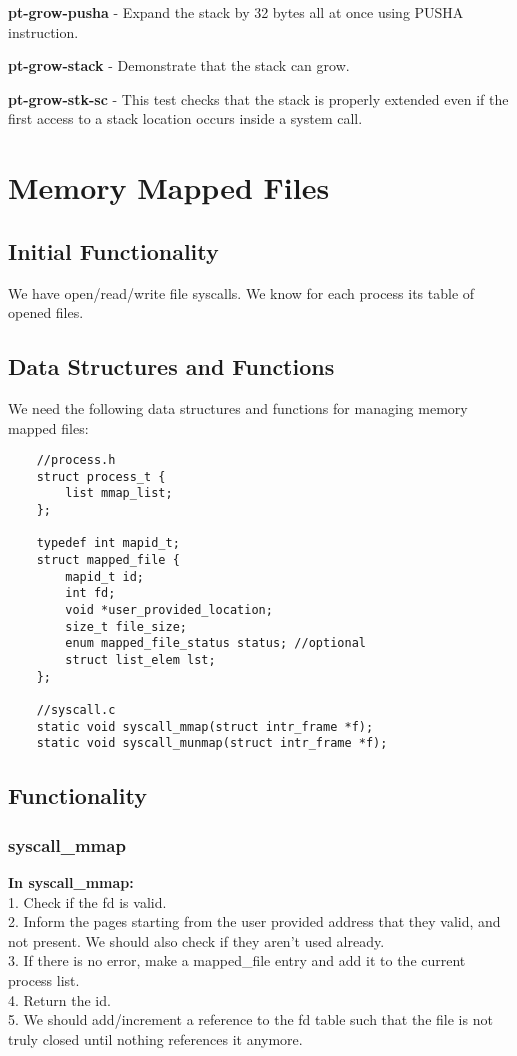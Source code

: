 \textbf{pt-grow-pusha} - Expand the stack by 32 bytes all at once using PUSHA instruction. 

\textbf{pt-grow-stack} - Demonstrate that the stack can grow. 

\textbf{pt-grow-stk-sc} - This test checks that the stack is properly extended even if the first access to a stack location occurs inside a system call. 



\section{Memory Mapped Files}
\subsection{Initial Functionality}

We have open/read/write file syscalls. We know for each process its table of opened files.


\subsection{Data Structures and Functions}

We need the following data structures and functions for managing memory mapped files: 

\begin{lstlisting}
	//process.h
	struct process_t {
		list mmap_list;
	};

	typedef int mapid_t;
	struct mapped_file {
		mapid_t id;
		int fd;
		void *user_provided_location;
		size_t file_size;
		enum mapped_file_status status; //optional
		struct list_elem lst;
	};

	//syscall.c
	static void syscall_mmap(struct intr_frame *f);
	static void syscall_munmap(struct intr_frame *f);
\end{lstlisting}
	


\subsection{Functionality}

\subsubsection{ syscall\_mmap }
\textbf{In syscall\_mmap:}
	\\1. Check if the fd is valid.
	\\2. Inform the pages starting from the user provided address that they valid, and not present. We should also check if they aren't used already.
	\\3. If there is no error, make a mapped\_file entry and add it to the current process list.
	\\4. Return the id.
	\\5. We should add/increment a reference to the fd table such that the file is not truly closed until nothing references it anymore.



